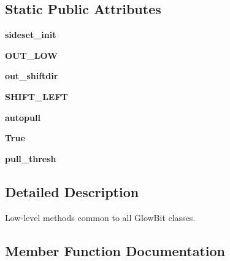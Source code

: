 \subsection*{Static Public Attributes}
\begin{DoxyCompactItemize}
\item 
\mbox{\label{classglowbit_1_1glowbit_a73c5457f4f8442a9ba5fdaa0cd7ea4b5}} 
{\bfseries sideset\+\_\+init}
\item 
\mbox{\label{classglowbit_1_1glowbit_a1ed8a1be31b4b872d9ccb7ac5e30892d}} 
{\bfseries O\+U\+T\+\_\+\+L\+OW}
\item 
\mbox{\label{classglowbit_1_1glowbit_a15cd9fc87ac01180b047877394d0c002}} 
{\bfseries out\+\_\+shiftdir}
\item 
\mbox{\label{classglowbit_1_1glowbit_a60284b74a652f430dbdde8e16a6c05a1}} 
{\bfseries S\+H\+I\+F\+T\+\_\+\+L\+E\+FT}
\item 
\mbox{\label{classglowbit_1_1glowbit_ae34f402180e4f4ec9a050b737504f078}} 
{\bfseries autopull}
\item 
\mbox{\label{classglowbit_1_1glowbit_a09fe7452d85b7fed1f154c22f125b6c7}} 
{\bfseries True}
\item 
\mbox{\label{classglowbit_1_1glowbit_ae08d4038b7463323e58b07c4020d484d}} 
{\bfseries pull\+\_\+thresh}
\end{DoxyCompactItemize}


\subsection{Detailed Description}
Low-\/level methods common to all Glow\+Bit classes. 

\subsection{Member Function Documentation}
\mbox{\label{classglowbit_1_1glowbit_ad3ace3e4d58bc9dadf62c1306aff2464}} 
